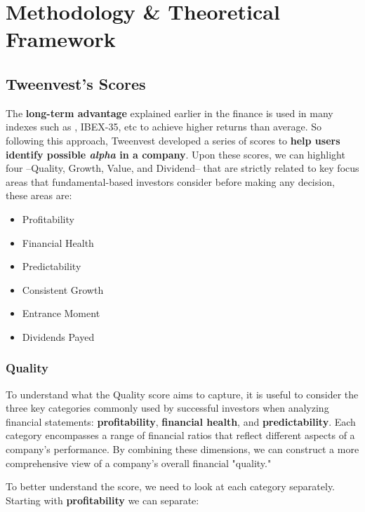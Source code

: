 \documentclass[11pt,english,a4paper,hidelinks]{book}
\begin{document}
\chapter{Methodology \& Theoretical Framework}


\section{Tweenvest's Scores}

The \textbf{long-term advantage} explained earlier in the finance is used in many indexes such as \textcite{msci2024fundamental}, IBEX-35, etc to achieve higher returns than average. So following this approach, Tweenvest developed a series of scores to \textbf{help users identify possible \textit{alpha} in a company}. Upon these scores, we can highlight four --Quality, Growth, Value, and Dividend-- that are strictly related to key focus areas that fundamental-based investors consider before making any decision, these areas are:
\begin{itemize}
    \item Profitability
    \item Financial Health
    \item Predictability
    \item Consistent Growth
    \item Entrance Moment
    \item Dividends Payed
\end{itemize}

\subsection{Quality}

\noindent To understand what the Quality score aims to capture, it is useful to consider the three key categories commonly used by successful investors when analyzing financial statements: \textbf{profitability}, \textbf{financial health}, and \textbf{predictability}. Each category encompasses a range of financial ratios that reflect different aspects of a company's performance. By combining these dimensions, we can construct a more comprehensive view of a company's overall financial "quality."


\vspace{0.5cm}
\noindent To better understand the score, we need to look at each category separately. Starting with \textbf{profitability} we can separate:
\end{document}
